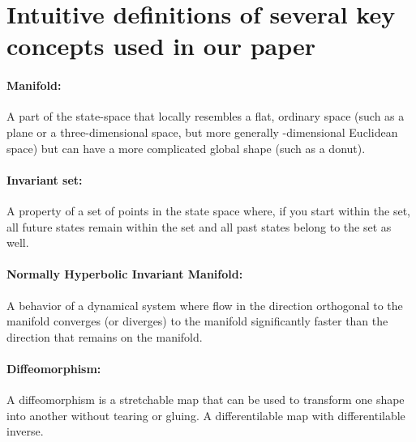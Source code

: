 \documentclass{article} %
\newcounter{ct}
\theoremstyle{definition}
\theoremstyle{remark}
\begin{document}
%


\section{Intuitive definitions of several key concepts used in our paper}\label{sec:supp:simplifications}


\paragraph{Manifold:} A part of the state-space that locally resembles a flat, ordinary space (such as a plane or a three-dimensional space, but more generally 
-dimensional Euclidean space) but can have a more complicated global shape (such as a donut).
\paragraph{Invariant set:} A property of a set of points in the state space where, if you start within the set, all future states remain within the set and all past states belong to the set as well.
\paragraph{Normally Hyperbolic Invariant Manifold:} A behavior of a dynamical system where flow in the direction orthogonal to the manifold converges (or diverges) to the manifold significantly faster than the direction that remains on the manifold.
\paragraph{Diffeomorphism:} A diffeomorphism is a stretchable map that can be used to transform one shape into another without tearing or gluing. 
A differentilable map with differentilable inverse.
\end{document}
